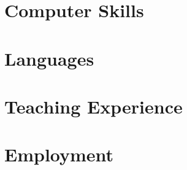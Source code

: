 \section*{Computer Skills}


\section*{Languages}


\section*{Teaching Experience}


\section*{Employment}


\thispagestyle{lastpagestyle}



